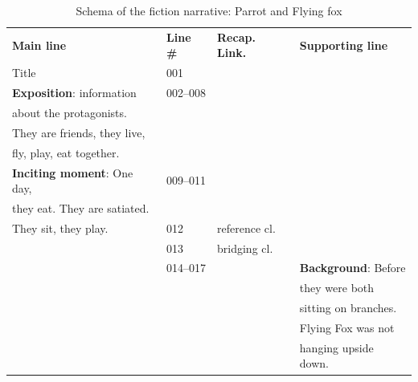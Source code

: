 \documentclass[output=paper]{LSP/langsci}
\begin{document}
\begin{table}[]
\footnotesize
\caption{Schema of the fiction narrative: Parrot and Flying fox}
\label{GuTable4}
\begin{tabular}{llll}
\textbf{Main line}                             & \textbf{Line \#} &   \textbf{Recap. Link.}      & \textbf{Supporting line}   \\
  Title                                            & 001               &               &               \\
\textbf{Exposition}: information                 & 002--008          &                 &                  \\
about the protagonists.                        &                    &                 &                       \\
They are friends, they live,                     &                   &                 &                          \\
 fly, play, eat together.                       &                    &                 &                             \\
\textbf{Inciting moment}: One day,         & 009--011               &                 &                           \\
they eat. They are satiated.                               &                &                 &                            \\
They sit, they play.                          & 012               &    reference cl.             &                                \\
                                            & 013                 & bridging cl. &                           \\
                                            & 014--017          &                 & \textbf{Background}: Before      \\
                                                 &                   &                 & they were both   \\                          
                                                   &                   &                 & sitting on branches.  \\
                                                &                   &                 & Flying Fox  was not            \\          
                                              &                   &                 & hanging upside down.           \\                                     

\end{tabular}
\end{table}
\end{document}
